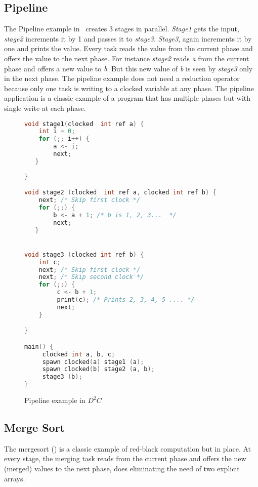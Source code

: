 \documentclass[10pt, conference, compsocconf]{IEEEtran}
\begin{document}
\subsection{Pipeline}
The Pipeline example in~
 creates 3 stages in parallel. \emph{Stage1} gets the input,
\emph{stage2} increments it by 1 and passes it to \emph{stage3}. 
\emph{Stage3}, again increments it by one and prints the value. Every task reads the value
from the current phase and offers the value to the next phase. 
For instance \emph{stage2} reads \emph{a} from the current phase 
and offers a new value to \emph{b}. But this new value of \emph{b} is seen by \emph{stage3} only 
in the next phase. The pipeline example does not need a reduction operator
because only one task is writing to a clocked variable at any phase. The pipeline application is a classic example
 of a program that has multiple phases but with single write at each phase.


\begin{figure}[htbp]
\begin{lstlisting}[language=C]
void stage1(clocked  int ref a) {
    int i = 0;
    for (;; i++) {
        a <- i;
        next;
   }
      
}

void stage2 (clocked  int ref a, clocked int ref b) {
    next; /* Skip first clock */
    for (;;) {
        b <- a + 1; /* b is 1, 2, 3...  */ 
        next;
   }


void stage3 (clocked int ref b) {
    int c;
    next; /* Skip first clock */
    next; /* Skip second clock */
    for (;;) {
         c <- b + 1;
         print(c); /* Prints 2, 3, 4, 5 .... */
         next; 
    }

}

main() {
     clocked int a, b, c; 
     spawn clocked(a) stage1 (a);
     spawn clocked(b) stage2 (a, b);
     stage3 (b);
}
\end{lstlisting}
\caption{Pipeline example in $D^2C$}
\label{fig:pipeline}
\end{figure}


\subsection{Merge Sort}
\label{sec:mergesort}

The mergesort () is a classic example of red-black computation
but in place.
At every stage, the merging task reads from the current phase
and offers the new (merged) values to the next phase, does
eliminating the need of two explicit arrays.
\end{document}
